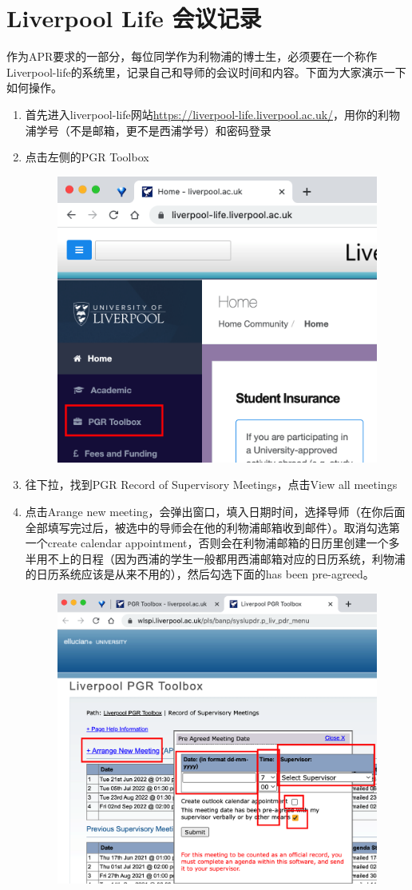 \section{Liverpool Life 会议记录}
\label{section:meeting_record}
作为APR要求的一部分，每位同学作为利物浦的博士生，必须要在一个称作Liverpool-life的系统里，记录自己和导师的会议时间和内容。下面为大家演示一下如何操作。

\begin{enumerate}
    \item 首先进入liverpool-life网站\url{https://liverpool-life.liverpool.ac.uk/}，用你的利物浦学号（不是邮箱，更不是西浦学号）和密码登录
    \item 点击左侧的PGR Toolbox
    \begin{figure}[H]
        \centering
        \includegraphics[width=0.5\columnwidth]{author-folder/Kai.Wu/meeting_record_figures/toolbox.png}
    \end{figure}
    \item 往下拉，找到PGR Record of Supervisory Meetings，点击View all meetings
    \item 点击Arange new meeting，会弹出窗口，填入日期时间，选择导师（在你后面全部填写完过后，被选中的导师会在他的利物浦邮箱收到邮件）。取消勾选第一个create calendar appointment，否则会在利物浦邮箱的日历里创建一个多半用不上的日程（因为西浦的学生一般都用西浦邮箱对应的日历系统，利物浦的日历系统应该是从来不用的），然后勾选下面的has been pre-agreed。
    \begin{figure}[H]
        \centering
        \includegraphics[width=0.5\columnwidth]{author-folder/Kai.Wu/meeting_record_figures/arange_new_meeting.png}

\end{figure}
\end{enumerate}
